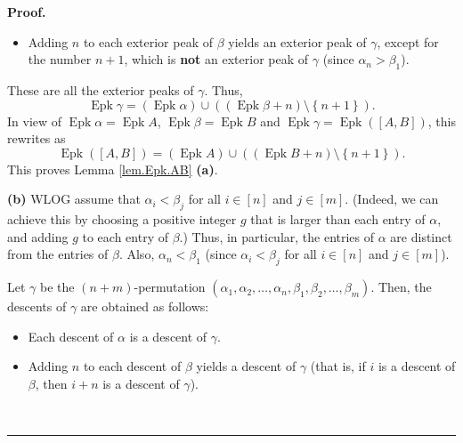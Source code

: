 \documentclass[numbers=enddot,12pt,final,onecolumn,notitlepage]{scrartcl}%
\theoremstyle{definition}
\newenvironment{proof}[1][Proof]{\noindent\textbf{#1.} }{\ \rule{0.5em}{0.5em}}
\newenvironment{verlong}{}{}
\begin{document}
\begin{verlong}
\begin{proof}
\begin{itemize}
\item Adding $n$ to each exterior peak of $\beta$ yields an exterior peak of
$\gamma$, except for the number $n+1$, which is \textbf{not} an exterior peak
of $\gamma$ (since $\alpha_{n}>\beta_{1}$).
\end{itemize}

These are all the exterior peaks of $\gamma$. Thus,%
\[
\operatorname*{Epk}\gamma=\left(  \operatorname*{Epk}\alpha\right)
\cup\left(  \left(  \operatorname*{Epk}\beta+n\right)  \setminus\left\{
n+1\right\}  \right)  .
\]
In view of $\operatorname*{Epk}\alpha=\operatorname*{Epk}A$,
$\operatorname*{Epk}\beta=\operatorname*{Epk}B$ and $\operatorname*{Epk}%
\gamma=\operatorname*{Epk}\left(  \left[  A,B\right]  \right)  $, this
rewrites as
\[
\operatorname*{Epk}\left(  \left[  A,B\right]  \right)  =\left(
\operatorname*{Epk}A\right)  \cup\left(  \left(  \operatorname*{Epk}%
B+n\right)  \setminus\left\{  n+1\right\}  \right)  .
\]
This proves Lemma \ref{lem.Epk.AB} \textbf{(a)}.

\textbf{(b)} WLOG assume that $\alpha_{i}<\beta_{j}$ for all $i\in\left[
n\right]  $ and $j\in\left[  m\right]  $. (Indeed, we can achieve this by
choosing a positive integer $g$ that is larger than each entry of $\alpha$,
and adding $g$ to each entry of $\beta$.) Thus, in particular, the entries of
$\alpha$ are distinct from the entries of $\beta$. Also, $\alpha_{n}<\beta
_{1}$ (since $\alpha_{i}<\beta_{j}$ for all $i\in\left[  n\right]  $ and
$j\in\left[  m\right]  $).

Let $\gamma$ be the $\left(  n+m\right)  $-permutation $\left(  \alpha
_{1},\alpha_{2},\ldots,\alpha_{n},\beta_{1},\beta_{2},\ldots,\beta_{m}\right)
$. Then, the descents of $\gamma$ are obtained as follows:

\begin{itemize}
\item Each descent of $\alpha$ is a descent of $\gamma$.

\item Adding $n$ to each descent of $\beta$ yields a descent of $\gamma$ (that
is, if $i$ is a descent of $\beta$, then $i+n$ is a descent of $\gamma$).
\end{itemize}


\end{proof}
\end{verlong}
\end{document}
